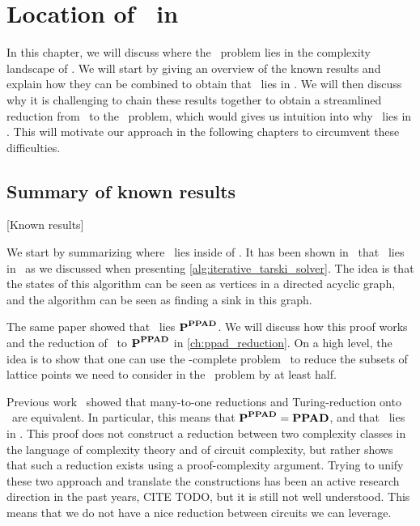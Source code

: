 \setchapterpreamble[u]{\margintoc}
\chapter{Location of \Tarski\ in \TFNP}

In this chapter, we will discuss where the \Tarski\ problem lies in the complexity landscape of \TFNP. We will start by giving an overview of the known results and explain how they can be combined to obtain that \Tarski\ lies in \EOPL. We will then discuss why it is challenging to chain these results together to obtain a streamlined reduction from \Tarski\ to the \EndOfPotentialLine\ problem, which would gives us intuition into why \Tarski\ lies in \EOPL. This will motivate our approach in the following chapters to circumvent these difficulties.

\section{Summary of known results}[Known results]

We start by summarizing where \Tarski\ lies inside of \TFNP. It has been shown in~\cite{etessami_tarskis_2020} that \Tarski\ lies in \PLS\ as we discussed when presenting \cref{alg:iterative_tarski_solver}. The idea is that the states of this algorithm can be seen as vertices in a directed acyclic graph, and the algorithm can be seen as finding a sink in this graph.

The same paper showed that \Tarski\ lies $\textbf{P}^{\textbf{PPAD}}$. We will discuss how this proof works and the reduction of \Tarski\ to $\textbf{P}^{\textbf{PPAD}}$ in \cref{ch:ppad_reduction}. On a high level, the idea is to show that one can use the \PPAD-complete problem \Brouwer\ to reduce the subsets of lattice points we need to consider in the \Tarski\ problem by at least half.

Previous work~ showed that many-to-one reductions and Turing-reduction onto \PPAD\ are equivalent. In particular, this means that $\textbf{P}^{\textbf{PPAD}} = \textbf{PPAD}$, and that \Tarski\ lies in \PPAD{}. This proof does not construct a reduction between two complexity classes in the language of complexity theory and of circuit complexity, but rather shows that such a reduction exists using a proof-complexity argument. Trying to unify these two approach and translate the constructions has been an active research direction in the past years, CITE TODO, but it is still not well understood. This means that we do not have a nice reduction between circuits we can leverage.

